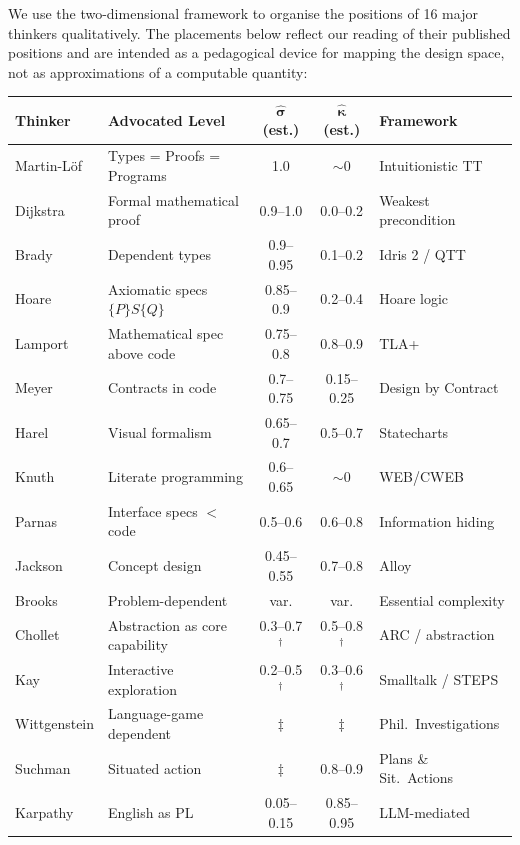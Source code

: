 \documentclass[11pt, a4paper, copyright]{googledeepmind}
\begin{document}
We use the two-dimensional framework to organise the positions of 16 major thinkers qualitatively. The placements below reflect our reading of their published positions and are intended as a pedagogical device for mapping the design space, not as approximations of a computable quantity:

\begin{table}[H]
\centering
\small
\begin{tabular}{llccl}
\toprule
\textbf{Thinker} & \textbf{Advocated Level} & $\boldsymbol{\hat{\sigma}}$ \textbf{(est.)} & $\boldsymbol{\hat{\kappa}}$ \textbf{(est.)} & \textbf{Framework} \\
\midrule
Martin-L\"{o}f & Types = Proofs = Programs & 1.0 & $\sim$0 & Intuitionistic TT \\
Dijkstra & Formal mathematical proof & 0.9--1.0 & 0.0--0.2 & Weakest precondition \\
Brady & Dependent types & 0.9--0.95 & 0.1--0.2 & Idris 2 / QTT \\
Hoare & Axiomatic specs $\{P\}S\{Q\}$ & 0.85--0.9 & 0.2--0.4 & Hoare logic \\
Lamport & Mathematical spec above code & 0.75--0.8 & 0.8--0.9 & TLA+ \\
Meyer & Contracts in code & 0.7--0.75 & 0.15--0.25 & Design by Contract \\
Harel & Visual formalism & 0.65--0.7 & 0.5--0.7 & Statecharts \\
Knuth & Literate programming & 0.6--0.65 & $\sim$0 & WEB/CWEB \\
Parnas & Interface specs $<$ code & 0.5--0.6 & 0.6--0.8 & Information hiding \\
Jackson & Concept design & 0.45--0.55 & 0.7--0.8 & Alloy \\
Brooks & Problem-dependent & var. & var. & Essential complexity \\
Chollet & Abstraction as core capability & 0.3--0.7$^\dagger$ & 0.5--0.8$^\dagger$ & ARC / abstraction \\
Kay & Interactive exploration & 0.2--0.5$^\dagger$ & 0.3--0.6$^\dagger$ & Smalltalk / STEPS \\
Wittgenstein & Language-game dependent & $\ddagger$ & $\ddagger$ & Phil.\ Investigations \\
Suchman & Situated action & $\ddagger$ & 0.8--0.9 & Plans \& Sit.\ Actions \\
Karpathy & English as PL & 0.05--0.15 & 0.85--0.95 & LLM-mediated \\
\bottomrule
\end{tabular}

\end{table}
\end{document}

